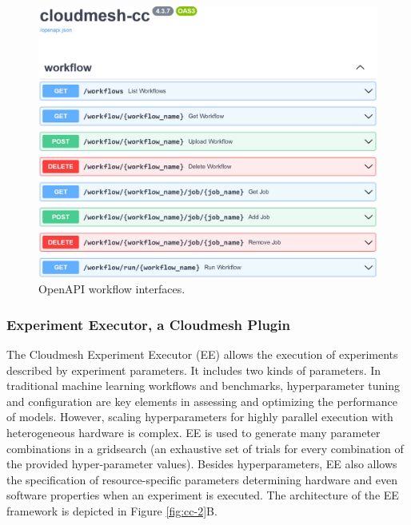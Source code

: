 \documentclass[sigconf]{acmart}
\begin{document}
\begin{figure}[htb]
    \centering\includegraphics[width=1.0\columnwidth]{images/fastapi-service-highres.jpg}
      
    \caption{OpenAPI workflow interfaces.}
    \label{fig:cc-3}
\end{figure}



\subsubsection{Experiment Executor, a Cloudmesh Plugin}
\label{sec:workflow-ee}

The Cloudmesh Experiment Executor (EE) \citep{las-frontiers-edu} allows the execution of experiments described by experiment parameters. It includes two kinds of parameters. In traditional machine learning workflows and benchmarks, hyperparameter tuning and configuration are key elements in assessing and optimizing the performance of models. However, scaling hyperparameters for highly parallel execution with heterogeneous hardware is complex. EE is used to generate many parameter combinations in a gridsearch (an exhaustive set of trials for every combination of the provided hyper-parameter values). Besides hyperparameters, EE also allows the specification of resource-specific parameters determining hardware and even software properties when an experiment is executed. The architecture of the EE framework is depicted in Figure \ref{fig:cc-2}B.
\end{document}
